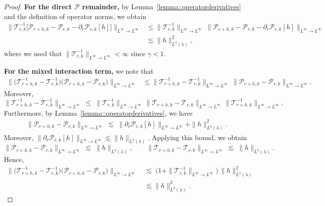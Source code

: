 \documentclass[11pt]{article}
\theoremstyle{plain}
\begin{document}
\begin{proof}
\noindent \textbf{For the direct $\mathcal{P}$ remainder,} by Lemma~\ref{lemma::operatorderivatives} and the definition of operator norms, we obtain
\begin{align*}
\big\|\mathcal{T}_{r,k}^{-1}\big[\mathcal{P}_{r+h,k} - \mathcal{P}_{r,k}
           - \partial_r \mathcal{P}_{r,k}[h]\big]\big\|_{L^\infty \to L^\infty}
&\leq \|\mathcal{T}_{r,k}^{-1}\|_{L^\infty \to L^\infty}\;
   \|\mathcal{P}_{r+h,k} - \mathcal{P}_{r,k}
           - \partial_r \mathcal{P}_{r,k}[h]\|_{L^\infty \to L^\infty} \\
&\lesssim 
   \|h\|_{L^2(\lambda)}^2,
\end{align*}
where we used that $ \|\mathcal{T}_{r,k}^{-1}\|_{L^\infty \to L^\infty} < \infty$ since $\gamma < 1$.


\noindent \textbf{For the mixed interaction term,} we note that
\begin{align*}
   \big\|\big(\mathcal{T}_{r+h,k}^{-1} - \mathcal{T}_{r,k}^{-1}\big)
       \big(\mathcal{P}_{r+h,k} - \mathcal{P}_{r,k}\big)\big\|_{L^\infty \to L^\infty} 
   &\leq  \|\mathcal{T}_{r+h,k}^{-1} - \mathcal{T}_{r,k}^{-1} \|_{L^\infty \to L^\infty}\;
       \|\mathcal{P}_{r+h,k} - \mathcal{P}_{r,k}\|_{L^\infty \to L^\infty}.
\end{align*}
Moreover,
\[
\|\mathcal{T}_{r+h,k}^{-1} - \mathcal{T}_{r,k}^{-1}\|_{L^\infty \to L^\infty}
\;\le\; \|\mathcal{T}_{r,k}^{-1}\|_{L^\infty \to L^\infty}\,
        \|\mathcal{T}_{r+h,k} - \mathcal{T}_{r,k}\|_{L^\infty \to L^\infty}\,
        \|\mathcal{T}_{r+h,k}^{-1}\|_{L^\infty \to L^\infty}.
\]
 Furthermore, by Lemma~\ref{lemma::operatorderivatives}, we have
\begin{align*}
    \big\| \mathcal{P}_{r + h, k}  - \mathcal{P}_{r, k}  
     \big\|_{L^\infty \to L^\infty}   
     \;\lesssim\; \|\partial_r \mathcal{P}_{r, k}[h]\|_{L^\infty \to L^\infty} 
     + \|h\|_{L^2(\lambda)}^2.
\end{align*}
Moreover, $\|\partial_r \mathcal{P}_{r, k}[h]\|_{L^\infty \to L^\infty} \lesssim \|h\|_{L^2(\lambda)}$. Applying this bound, we obtain
\[
\|\mathcal{P}_{r+h,k} - \mathcal{P}_{r,k}\|_{L^\infty \to L^\infty}
\;\lesssim\; \|h\|_{L^2(\lambda)}, 
\qquad
\|\mathcal{T}_{r+h,k} - \mathcal{T}_{r,k}\|_{L^\infty \to L^\infty}
\;\lesssim\; \|h\|_{L^2(\lambda)}.
\]
Hence,
\begin{align*}
   \big\|\big(\mathcal{T}_{r+h,k}^{-1} - \mathcal{T}_{r,k}^{-1}\big)
       \big(\mathcal{P}_{r+h,k} - \mathcal{P}_{r,k}\big)\big\|_{L^\infty \to L^\infty} 
   &\;\lesssim\; \big(1 + \|\mathcal{T}_{r,k}^{-1}\|_{L^\infty \to L^\infty}\big)\,
      \|h\|_{L^2(\lambda)}^2\\
       &\;\lesssim \|h\|_{L^2(\lambda)}^2.
\end{align*}




\end{proof}
\end{document}
